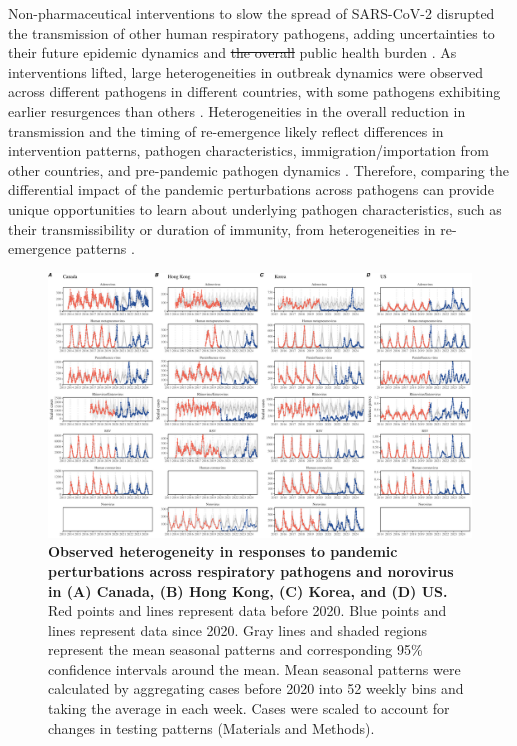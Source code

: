 \documentclass[12pt]{article}
\providecommand{\DIFaddtex}[1]{{\protect\color{blue}\uwave{#1}}} %
\providecommand{\DIFdeltex}[1]{{\protect\color{red}\sout{#1}}}                      %
\providecommand{\DIFaddbegin}{} %
\providecommand{\DIFaddend}{} %
\providecommand{\DIFdelbegin}{} %
\providecommand{\DIFdelend}{} %
\providecommand{\DIFadd}[1]{\texorpdfstring{\DIFaddtex{#1}}{#1}} %
\providecommand{\DIFdel}[1]{\texorpdfstring{\DIFdeltex{#1}}{}} %
\newcommand{\DIFscaledelfig}{0.5}
\newlength{\DIFdelgraphicswidth} %
\newlength{\DIFdelgraphicsheight} %
\newcommand{\DIFaddincludegraphics}[2][]{{\color{blue}\fbox{\DIFOincludegraphics[#1]{#2}}}} %
\newcommand{\DIFdelincludegraphics}[2][]{%
\sbox{\DIFdelgraphicsbox}{\DIFOincludegraphics[#1]{#2}}%
\settoboxwidth{\DIFdelgraphicswidth}{\DIFdelgraphicsbox} %
\settoboxtotalheight{\DIFdelgraphicsheight}{\DIFdelgraphicsbox} %
\scalebox{\DIFscaledelfig}{%
\parbox[b]{\DIFdelgraphicswidth}{\usebox{\DIFdelgraphicsbox}\\[-\baselineskip] \rule{\DIFdelgraphicswidth}{0em}}\llap{\resizebox{\DIFdelgraphicswidth}{\DIFdelgraphicsheight}{%
\setlength{\unitlength}{\DIFdelgraphicswidth}%
\begin{picture}(1,1)%
\thicklines\linethickness{2pt} %
{\color[rgb]{1,0,0}\put(0,0){\framebox(1,1){}}}%
{\color[rgb]{1,0,0}\put(0,0){\line( 1,1){1}}}%
{\color[rgb]{1,0,0}\put(0,1){\line(1,-1){1}}}%
\end{picture}%
}\hspace*{3pt}}} %
} %
\DeclareRobustCommand{\DIFaddbegin}{\DIFOaddbegin \let\includegraphics\DIFaddincludegraphics} %
\DeclareRobustCommand{\DIFaddend}{\DIFOaddend \let\includegraphics\DIFOincludegraphics} %
\DeclareRobustCommand{\DIFdelbegin}{\DIFOdelbegin \let\includegraphics\DIFdelincludegraphics} %
\DeclareRobustCommand{\DIFdelend}{\DIFOaddend \let\includegraphics\DIFOincludegraphics} %
\begin{document}
\DIFaddend Non-pharmaceutical interventions to slow the spread of SARS-CoV-2 disrupted the transmission of other human respiratory pathogens, adding uncertainties to their future epidemic dynamics and \DIFdelbegin \DIFdel{the overall }\DIFdelend \DIFaddbegin \DIFadd{their }\DIFaddend public health burden \citep{baker2020impact}.
As interventions lifted, large heterogeneities in outbreak dynamics were observed across different pathogens in different countries, with some pathogens exhibiting earlier \DIFaddbegin \DIFadd{and faster }\DIFaddend resurgences than others \citep{gomez2021uncertain,koltai2022determinants,park2024predicting}.
Heterogeneities in the overall reduction in transmission and the timing of re-emergence likely reflect differences in intervention patterns, pathogen characteristics, immigration/importation from other countries, and pre-pandemic pathogen dynamics \citep{perofsky2024impacts}.
Therefore, comparing the differential impact of the pandemic perturbations across pathogens can provide unique opportunities to learn about underlying pathogen characteristics, such as their transmissibility or duration of immunity, from heterogeneities in re-emergence patterns \citep{chow2023effects}.

\begin{figure}[!th]
\includegraphics[width=\textwidth]{../figure1/figure1.pdf}
\caption{
\textbf{Observed heterogeneity in responses to pandemic perturbations across respiratory pathogens and norovirus in (A) Canada, (B) Hong Kong, (C) Korea, and (D) US.}
Red points and lines represent data before 2020.
Blue points and lines represent data since 2020.
Gray lines and shaded regions represent the mean seasonal patterns and corresponding 95\% confidence intervals around the mean.
Mean seasonal patterns were calculated by aggregating cases before 2020 into 52 weekly bins and taking the average in each week.
Cases were scaled to account for changes in testing patterns (Materials and Methods).
}
\end{figure} 
\end{document}
